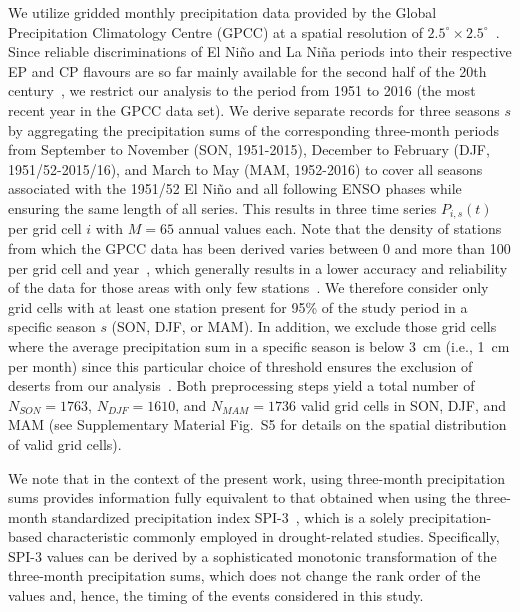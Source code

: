 \documentclass[utf8]{frontiersSCNS} %
\begin{document}
We utilize gridded monthly precipitation data provided by the Global Precipitation Climatology Centre (GPCC) at a spatial resolution of $2.5^\circ \times 2.5^\circ$~\citep{schneider_gpcc_2018}. Since reliable 
discriminations of El Ni\~no and La Ni\~na periods into their respective EP and CP flavours are so far mainly available for the second half of the 20th century~\citep{wiedermann_climate_2016,freund2019higher,graf_central_2012, yuan2013different}, we restrict our analysis to the period from 1951 to 2016 (the most recent year in the GPCC data set). We derive separate records for three seasons $s$ by aggregating the precipitation sums of the corresponding three-month periods from September to November (SON, 1951-2015), December to February (DJF, 1951/52-2015/16), and March to May (MAM, 1952-2016) to cover all seasons associated with the 1951/52 El Ni\~no and all following ENSO phases while ensuring the same length of all series. This results in three time series $P_{i,s}(t)$ per grid cell $i$ with $M=65$ annual values each. Note that the density of stations from which the GPCC data has been derived varies between 0 and more than 100 per grid cell and year~\citep{lorenz2012}, which generally results in a lower accuracy and reliability of the data for those areas with only few stations~\citep{rudolf_terrestrial_1994}. We therefore consider only grid cells with at least one station present for 95\% of the study period in a specific season
$s$ (SON, DJF, or MAM). In addition, we exclude those grid cells where the average precipitation sum in a specific season is below 3~cm (i.e., 1~cm per month) since this particular choice of threshold ensures the exclusion of deserts from our analysis~\citep{houston_variability_2006, thomas_twentieth-century_2018, chatterton_monthly_1971}. Both preprocessing steps yield a total number of $N_{SON}=1763$, $N_{DJF}=1610$, and $N_{MAM}=1736$ valid grid cells in SON, DJF, and MAM (see Supplementary Material Fig.~S5 for details on the spatial distribution of valid grid cells). 

We note that in the context of the present work, using three-month precipitation sums provides information fully equivalent to that obtained when using the three-month standardized precipitation index \mbox{SPI-3}~\citep{svoboda2012standardized, guttman1999accepting}, which is a solely precipitation-based characteristic commonly employed in drought-related studies. Specifically, SPI-3 values can be derived by a sophisticated monotonic transformation of the three-month precipitation sums, which does not change the rank order of the values and, hence, the timing of the events considered in this study.\\
\end{document}

